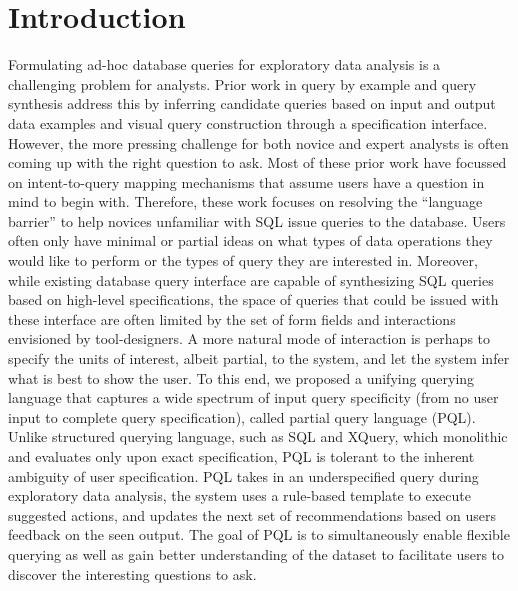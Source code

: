 \documentclass{sig-alternate-05-2015}
\begin{document}
\section{Introduction}
Formulating ad-hoc database queries for exploratory data analysis is a challenging problem for analysts. Prior work in query by example and query synthesis address this by inferring candidate queries based on input and output data examples and visual query construction through a specification interface.  However, the more pressing challenge for both novice and expert analysts is often coming up with the right question to ask. Most of these prior work have focussed on intent-to-query mapping mechanisms that assume users have a question in mind to begin with. Therefore, these work focuses on resolving the “language barrier” to help novices unfamiliar with SQL issue queries to the database. Users often only have minimal or partial ideas on what types of data operations they would like to perform or the types of query they are interested in.  Moreover, while existing database query interface are capable of synthesizing SQL queries based on high-level specifications, the space of queries that could be issued with these interface are often limited by the set of form fields and interactions envisioned by tool-designers. A more natural mode of interaction is perhaps to specify the units of interest, albeit partial, to the system, and let the system infer what is best to show the user.
To this end, we proposed a unifying querying language that captures a wide spectrum of input query specificity (from no user input to complete query specification), called partial query language (PQL). Unlike structured querying language, such as SQL and XQuery, which monolithic and evaluates only upon exact specification, PQL is tolerant to the inherent ambiguity of user specification. PQL takes in an underspecified query during exploratory data analysis, the system uses a rule-based template to execute suggested actions, and updates the next set of recommendations based on users feedback on the seen output. The goal of PQL is to simultaneously enable flexible querying as well as gain better understanding of the dataset to facilitate users to discover the interesting questions to ask.
\end{document}
